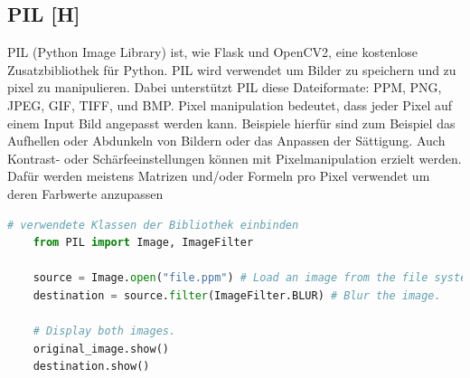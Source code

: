 \subsection{PIL [H]}
PIL (Python Image Library) ist, wie Flask und OpenCV2, eine kostenlose Zusatzbibliothek für Python.
PIL wird verwendet um Bilder zu speichern und zu pixel zu manipulieren. Dabei unterstützt PIL diese
Dateiformate: PPM, PNG, JPEG, GIF, TIFF, und BMP. Pixel manipulation bedeutet, dass jeder Pixel auf einem
Input Bild angepasst werden kann. Beispiele hierfür sind zum Beispiel das Aufhellen oder Abdunkeln von
Bildern oder das Anpassen der Sättigung. Auch Kontrast- oder Schärfeeinstellungen können mit
Pixelmanipulation erzielt werden. Dafür werden meistens Matrizen und/oder Formeln pro Pixel verwendet um
deren Farbwerte anzupassen
\\



\begin{lstlisting}[language=Python,caption=PIL Demo,label=lst:tech:PIL]
    # verwendete Klassen der Bibliothek einbinden
    from PIL import Image, ImageFilter  

    source = Image.open("file.ppm") # Load an image from the file system.
    destination = source.filter(ImageFilter.BLUR) # Blur the image.

    # Display both images.
    original_image.show() 
    destination.show()
\end{lstlisting}




